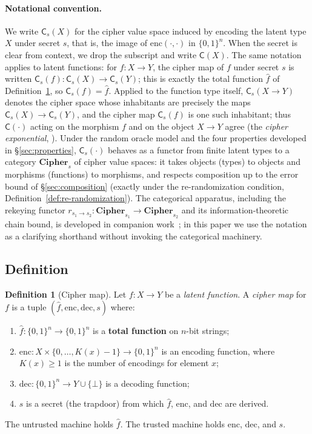 \documentclass[11pt]{article}
\theoremstyle{definition}
\newtheorem{definition}{Definition}[section]
\theoremstyle{plain}
\theoremstyle{remark}
\newcommand{\fhat}{\hat{f}}
\newcommand{\enc}{\mathrm{enc}}
\newcommand{\dec}{\mathrm{dec}}
\newcommand{\B}{\{0,1\}}
\newcommand{\cipher}[1]{\mathsf{C}(#1)}
\newcommand{\cipherS}[2]{\mathsf{C}_{#2}(#1)}
\begin{document}
\paragraph{Notational convention.}
We write $\cipherS{X}{s}$ for the cipher value space induced by encoding
the latent type $X$ under secret $s$, that is, the image of $\enc(\cdot,
\cdot)$ in $\B^n$.  When the secret is clear from context, we drop the
subscript and write $\cipher{X}$.  The same notation applies to latent
functions: for $f : X \to Y$, the cipher map of $f$ under secret $s$ is
written $\cipherS{f}{s} : \cipherS{X}{s} \to \cipherS{Y}{s}$; this is
exactly the total function $\fhat$ of Definition~\ref{def:cipher-map},
so $\cipherS{f}{s} = \fhat$.  Applied to the function type itself,
$\cipherS{X \to Y}{s}$ denotes the cipher space whose inhabitants are
precisely the maps $\cipherS{X}{s} \to \cipherS{Y}{s}$, and the cipher
map $\cipherS{f}{s}$ is one such inhabitant; thus $\cipher{\cdot}$
acting on the morphism $f$ and on the object $X \to Y$ agree (the
\emph{cipher exponential}, \cite[Prop.~4.3]{towell2026algebraic}).
Under the
random oracle model and the four properties developed in
\S\ref{sec:properties}, $\cipherS{\cdot}{s}$ behaves as a functor from
finite latent types to a category $\mathbf{Cipher}_s$ of cipher value
spaces: it takes objects (types) to objects and morphisms (functions) to
morphisms, and respects composition up to the error bound of
\S\ref{sec:composition} (exactly under the re-randomization condition,
Definition~\ref{def:re-randomization}).  The categorical apparatus,
including the rekeying functor $r_{s_1 \to s_2} :
\mathbf{Cipher}_{s_1} \to \mathbf{Cipher}_{s_2}$ and its information-theoretic
chain bound, is developed in companion work~\cite{towell2026rekeying};
in this paper we use the notation as a clarifying shorthand without
invoking the categorical machinery.

\subsection{Definition}

\begin{definition}[Cipher map]
\label{def:cipher-map}
Let $f : X \to Y$ be a \emph{latent function}.  A \emph{cipher map} for
$f$ is a tuple $(\fhat, \enc, \dec, s)$ where:
\begin{enumerate}
\item $\fhat : \{0,1\}^n \to \{0,1\}^n$ is a \textbf{total function} on
      $n$-bit strings;
\item $\enc : X \times \{0, \ldots, K(x){-}1\} \to \{0,1\}^n$ is an encoding
      function, where $K(x) \geq 1$ is the number of encodings for element $x$;
\item $\dec : \{0,1\}^n \to Y \cup \{\bot\}$ is a decoding function;
\item $s$ is a secret (the trapdoor) from which $\fhat$, $\enc$, and $\dec$
      are derived.
\end{enumerate}
The untrusted machine holds $\fhat$.  The trusted machine holds $\enc$,
$\dec$, and $s$.
\end{definition}
\end{document}
